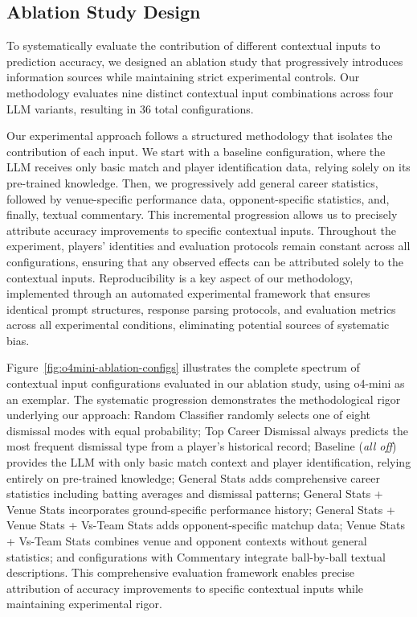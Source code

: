 \documentclass[sigconf,anonymous,review]{acmart}
\begin{document}
\subsection{Ablation Study Design}
To systematically evaluate the contribution of different contextual inputs to prediction accuracy, we designed an ablation study that progressively introduces information sources while maintaining strict experimental controls. Our methodology evaluates nine distinct contextual input combinations across four LLM variants, resulting in 36 total configurations.

Our experimental approach follows a structured methodology that isolates the contribution of each input. We start with a baseline configuration, where the LLM receives only basic match and player identification data, relying solely on its pre-trained knowledge. Then, we progressively add general career statistics, followed by venue-specific performance data, opponent-specific statistics, and, finally, textual commentary. This incremental progression allows us to precisely attribute accuracy improvements to specific contextual inputs. Throughout the experiment, players' identities and evaluation protocols remain constant across all configurations, ensuring that any observed effects can be attributed solely to the contextual inputs.
Reproducibility is a key aspect of our methodology, implemented through an automated experimental framework that ensures identical prompt structures, response parsing protocols, and evaluation metrics across all experimental conditions, eliminating potential sources of systematic bias.

Figure~\ref{fig:o4mini-ablation-configs} illustrates the complete spectrum of contextual input configurations evaluated in our ablation study, using o4-mini as an exemplar. The systematic progression demonstrates the methodological rigor underlying our approach: Random Classifier randomly selects one of eight dismissal modes with equal probability; Top Career Dismissal always predicts the most frequent dismissal type from a player's historical record; Baseline (\emph{all off}) provides the LLM with only basic match context and player identification, relying entirely on pre-trained knowledge; General Stats adds comprehensive career statistics including batting averages and dismissal patterns; General Stats + Venue Stats incorporates ground-specific performance history; General Stats + Venue Stats + Vs-Team Stats adds opponent-specific matchup data; Venue Stats + Vs-Team Stats combines venue and opponent contexts without general statistics; and configurations with Commentary integrate ball-by-ball textual descriptions. This comprehensive evaluation framework enables precise attribution of accuracy improvements to specific contextual inputs while maintaining experimental rigor.
\end{document}

